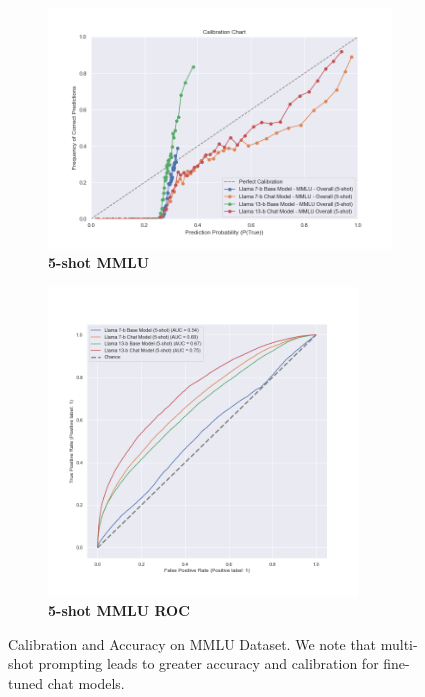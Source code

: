 \documentclass[11pt]{article}
\begin{document}
\begin{figure}
\begin{subfigure}[b]{0.38\textwidth}
    \end{subfigure}  
     \hfill
     \begin{subfigure}[b]{0.60\textwidth}
         \centering
         \includegraphics[width=1.1\textwidth]{figures/5-shot-MMLU.png}
         \caption{\textbf{5-shot MMLU} }
         \label{fig:5-shot-logicqa}
     \end{subfigure}     
     \begin{subfigure}[b]{0.38\textwidth}
         \centering 
         \includegraphics[width=0.9\textwidth]{figures/5-shot-MMLU-roc.png}
         \caption{\textbf{5-shot MMLU ROC} }
         \label{fig:0-shot-MMLU}
    \end{subfigure} 
    
        \caption{Calibration and Accuracy on MMLU Dataset. We note that multi-shot prompting leads 
        to greater accuracy and calibration for fine-tuned chat models.}
        \label{fig:three graphs}
\end{figure}
\end{document}
